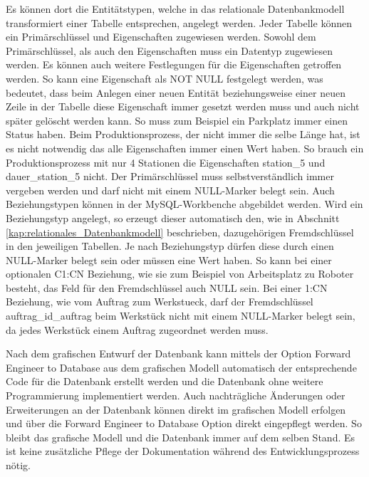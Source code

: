 Es können dort die Entitätstypen, welche in das relationale Datenbankmodell transformiert einer Tabelle entsprechen, angelegt werden. Jeder Tabelle können ein Primärschlüssel und Eigenschaften zugewiesen werden. Sowohl dem Primärschlüssel, als auch den Eigenschaften muss ein Datentyp zugewiesen werden. Es können auch weitere Festlegungen für die Eigenschaften getroffen werden. So kann eine Eigenschaft als \glqq NOT NULL\grqq{}  festgelegt werden, was bedeutet, dass beim Anlegen einer neuen Entität beziehungsweise einer neuen Zeile in der Tabelle diese Eigenschaft immer gesetzt werden muss und auch nicht später gelöscht werden kann. So muss zum Beispiel ein Parkplatz immer einen Status haben. Beim Produktionsprozess, der nicht immer die selbe Länge hat, ist es nicht notwendig das alle Eigenschaften immer einen Wert haben. So brauch ein Produktionsprozess mit nur 4 Stationen die Eigenschaften \glqq station\_5\grqq{}  und \glqq dauer\_station\_5\grqq{}  nicht. Der Primärschlüssel muss selbstverständlich immer vergeben werden und darf nicht mit einem  NULL-Marker belegt sein.
Auch Beziehungstypen können in der MySQL-Workbenche abgebildet werden. Wird ein Beziehungstyp angelegt, so erzeugt dieser automatisch den, wie in Abschnitt \ref{kap:relationales_Datenbankmodell} beschrieben, dazugehörigen Fremdschlüssel in den jeweiligen Tabellen. Je nach Beziehungstyp dürfen diese durch einen NULL-Marker belegt  sein oder müssen eine Wert haben. So kann bei einer optionalen C1:CN Beziehung, wie sie zum Beispiel von Arbeitsplatz zu Roboter besteht, das Feld für den Fremdschlüssel auch \glqq NULL\grqq{}  sein. Bei einer 1:CN Beziehung, wie vom Auftrag zum Werkstueck, darf der Fremdschlüssel \glqq auftrag\_id\_auftrag\grqq{}  beim Werkstück nicht mit einem NULL-Marker belegt sein, da jedes Werkstück einem Auftrag zugeordnet werden muss.
 
Nach dem grafischen Entwurf der Datenbank kann mittels der Option \glqq Forward Engineer to Database\grqq{}  aus dem grafischen Modell automatisch der entsprechende Code für die Datenbank erstellt werden und die Datenbank ohne weitere Programmierung implementiert werden. Auch nachträgliche Änderungen oder Erweiterungen an der Datenbank können direkt im grafischen Modell erfolgen und über die \glqq Forward Engineer to Database\grqq{}  Option direkt eingepflegt werden. So bleibt das grafische Modell und die Datenbank immer auf dem selben Stand. Es ist keine zusätzliche Pflege der Dokumentation während des Entwicklungsprozess nötig. 
 
